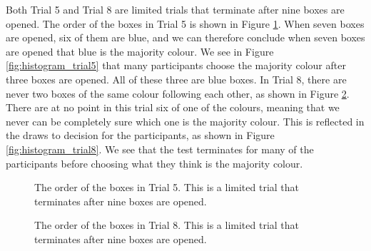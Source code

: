 Both Trial 5 and Trial 8 are limited trials that terminate after nine boxes are opened. The order of the boxes in Trial 5 is shown in Figure \ref{fig:trial5_order}. When seven boxes are opened, six of them are blue, and we can therefore conclude when seven boxes are opened that blue is the majority colour. We see in Figure \ref{fig:histogram_trial5} that many participants choose the majority colour after three boxes are opened. All of these three are blue boxes. In Trial 8, there are never two boxes of the same colour following each other, as shown in Figure \ref{fig:trial8_order}. There are at no point in this trial six of one of the colours, meaning that we never can be completely sure which one is the majority colour. This is reflected in the draws to decision for the participants, as shown in Figure \ref{fig:histogram_trial8}. We see that the test terminates for many of the participants before choosing what they think is the majority colour.  
\begin{figure}
    \centering
    \scalebox{0.8}{}
    \caption[Order of Boxes in Trial 5]{The order of the boxes in Trial 5. This is a limited trial that terminates after nine boxes are opened.}
    \label{fig:trial5_order}
\end{figure}
\begin{figure}
    \centering
    \scalebox{0.8}{}
    \caption[Order of Boxes in Trial 8]{The order of the boxes in Trial 8. This is a limited trial that terminates after nine boxes are opened.}
    \label{fig:trial8_order}
\end{figure}
